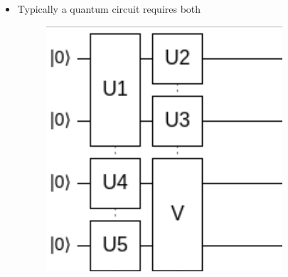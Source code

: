 \documentclass[11.5pt, paper=a4]{article}
\theoremstyle{definition}
\numberwithin{theorem}{section}
\begin{document}
\begin{itemize}
    \item Typically a quantum circuit requires both 
        \begin{figure}[h]
                    \centering
                    \includegraphics[scale=0.4]{images/Tensor Product3.png}
                \end{figure}\\
    
\end{itemize}
\end{document}
